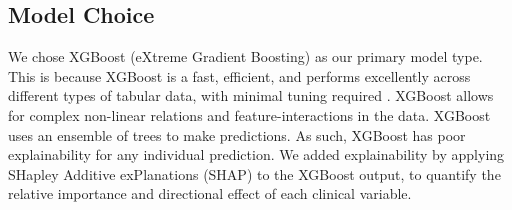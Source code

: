 \subsection{Model Choice}

We chose XGBoost (eXtreme Gradient Boosting) \cite{chen_xgboost_2016} as our primary model type. This is because XGBoost is  a fast, efficient, and performs excellently across different types of tabular data, with minimal tuning required \cite{shwartz-ziv_tabular_2022}. XGBoost allows for complex non-linear relations and feature-interactions in the data. XGBoost uses an ensemble of trees to make predictions. As such, XGBoost has poor explainability for any individual prediction. We added explainability by applying SHapley Additive exPlanations (SHAP) \cite{lundberg_consistent_2019} to the XGBoost output, to quantify the relative importance and directional effect of each clinical variable.
